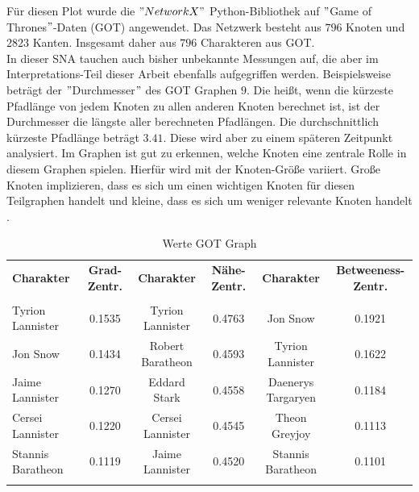 Für diesen Plot wurde die $"NetworkX"$ Python-Bibliothek auf $"$Game of Thrones$"$-Daten (GOT) angewendet. Das Netzwerk besteht aus $796$ Knoten und $2823$ Kanten. Insgesamt daher aus $796$ Charakteren aus GOT.\\
In dieser SNA tauchen auch bisher unbekannte Messungen auf, die aber im Interpretations-Teil dieser Arbeit ebenfalls aufgegriffen werden. Beispielsweise beträgt der $"$Durchmesser$"$ des GOT Graphen $9$. Die heißt, wenn die kürzeste Pfadlänge von jedem Knoten zu allen anderen Knoten berechnet ist, ist der Durchmesser die längste aller berechneten Pfadlängen. Die durchschnittlich kürzeste Pfadlänge beträgt $3.41$. Diese wird aber zu einem späteren Zeitpunkt analysiert. Im Graphen ist gut zu erkennen, welche Knoten eine zentrale Rolle in diesem Graphen spielen. Hierfür wird mit der Knoten-Größe variiert. Große Knoten implizieren, dass es sich um einen wichtigen Knoten für diesen Teilgraphen handelt und kleine, dass es sich um weniger relevante Knoten handelt \cite{GOT}. 
\begin{table}[h!]
\footnotesize
\caption{Werte GOT Graph}
\label{TableGOT}
\begin{tabular}{lccccc}\toprule 
\textbf{Charakter} &\textbf{Grad-Zentr.} & \textbf{Charakter} &\textbf{Nähe-Zentr.}  & \textbf{Charakter} &\textbf{Betweeness-Zentr.} \\
 &\\\midrule
  Tyrion Lannister & 0.1535  & Tyrion Lannister & 0.4763 & Jon Snow& 0.1921   \\
  Jon Snow & 0.1434 & Robert Baratheon & 0.4593 & Tyrion Lannister & 0.1622   \\
  Jaime Lannister & 0.1270  & Eddard Stark& 0.4558& Daenerys Targaryen & 0.1184   \\
  Cersei Lannister & 0.1220 & Cersei Lannister & 0.4545 & Theon Greyjoy & 0.1113   \\
  Stannis Baratheon & 0.1119 & Jaime Lannister & 0.4520 & Stannis Baratheon & 0.1101   \\
       
  \\\bottomrule
 \end{tabular}
 \end{table}
